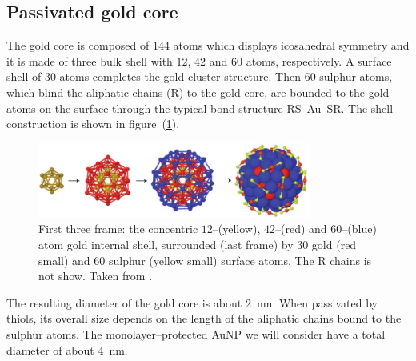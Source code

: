 \subsection{Passivated gold core}
The gold core is composed of $144$ atoms which displays icosahedral symmetry and it is made of three bulk shell with $12$, $42$ and $60$ atoms, respectively. A surface shell of $30$ atoms completes the gold cluster structure. Then $60$ sulphur atoms, which blind the aliphatic chains (R) to the gold core, are bounded to the gold atoms on the surface through the typical bond structure RS--Au--SR. The shell construction is shown in figure~(\ref{fig:goldShell}).
\begin{figure}[!ht]
	\centering
	\includegraphics[width=0.8\textwidth]{./img/goldShell}
	\caption{First three frame: the concentric $12$--(yellow), $42$--(red) and $60$--(blue) atom gold internal shell, surrounded (last frame) by $30$ gold (red small) and $60$ sulphur (yellow small) surface atoms. The R chains is not show. Taken from \cite{corePassivated}.}
	\label{fig:goldShell}
\end{figure}

The resulting diameter of the gold core is about $2$~nm. When passivated by thiols, its overall size depends on the length of the aliphatic chains bound to the sulphur atoms. The monolayer--protected \ac{AuNP} we will consider have a total diameter of about $4$~nm.

